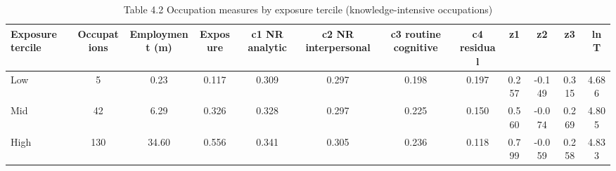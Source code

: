 \begin{table}[htbp]\centering
\caption{Table 4.2 Occupation measures by exposure tercile (knowledge-intensive occupations)}
\begin{tabular}{lccccccccccc}
\toprule
Exposure tercile & Occupations & Employment (m) & Exposure & c1 NR analytic & c2 NR interpersonal & c3 routine cognitive & c4 residual & z1 & z2 & z3 & ln T \\
\midrule
Low & 5 & 0.23 & 0.117 & 0.309 & 0.297 & 0.198 & 0.197 & 0.257 & -0.149 & 0.315 & 4.686 \\
Mid & 42 & 6.29 & 0.326 & 0.328 & 0.297 & 0.225 & 0.150 & 0.560 & -0.074 & 0.269 & 4.805 \\
High & 130 & 34.60 & 0.556 & 0.341 & 0.305 & 0.236 & 0.118 & 0.799 & -0.059 & 0.258 & 4.833 \\
\bottomrule
\end{tabular}
\par\vspace{2pt}{\footnotesize Means weighted by OEWS employment. Terciles as assigned in step 03.}
\end{table}
